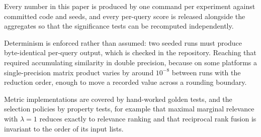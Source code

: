 Every number in this paper is produced by one command per experiment against
committed code and seeds, and every per-query score is released alongside the
aggregates so that the significance tests can be recomputed independently.

Determinism is enforced rather than assumed: two seeded runs must produce
byte-identical per-query output, which is checked in the repository. Reaching
that required accumulating similarity in double precision, because on some
platforms a single-precision matrix product varies by around $10^{-8}$ between
runs with the reduction order, enough to move a recorded value across a rounding
boundary.

Metric implementations are covered by hand-worked golden tests, and the selection
policies by property tests, for example that maximal marginal relevance with
$\lambda = 1$ reduces exactly to relevance ranking and that reciprocal rank fusion
is invariant to the order of its input lists.
